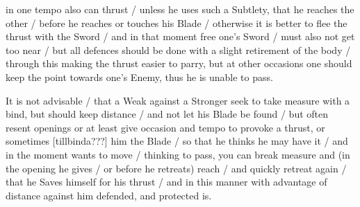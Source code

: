 \newpage


\newpage


in one tempo also can thrust / unless he uses such a Subtlety, that he
reaches the other / before he reaches or touches his Blade / otherwise
it is better to flee the thrust with the Sword / and in that moment
free one's Sword / must also not get too near / but all defences
should be done with a slight retirement of the body / through this
making the thrust easier to parry, but at other occasions one should
keep the point towards one's Enemy, thus he is unable to pass.


It is not advisable / that a Weak against a Stronger seek to take
measure with a bind, but should keep distance / and not let his Blade
be found / but often resent openings or at least give occasion and
tempo to provoke a thrust, or sometimes
[tillbinda???] him the Blade / so that he thinks he may have it / and in the
moment wants to move / thinking to pass, you can break measure and (in
the opening he gives / or before he retreats) reach / and quickly
retreat again / that he Saves himself for his thrust / and in this
manner with advantage of distance against him defended, and protected is.

